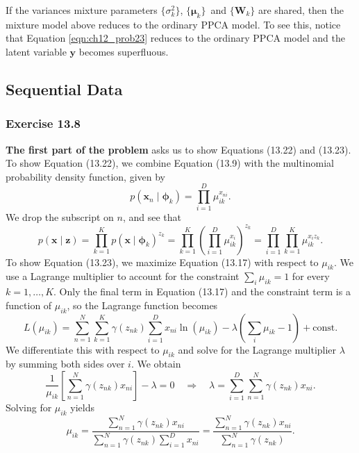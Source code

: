 \documentclass[12pt, a4paper]{article}
\newcommand{\vect}[1]{\bm{#1}}
\begin{document}
If the variances mixture parameters $\{\sigma^2_k\}$, $\{\vect{\mu}_k\}$ and $\{\vect{W}_k\}$ are shared, then the mixture model above reduces to the ordinary PPCA model.
To see this, notice that Equation \eqref{eqn:ch12_prob23} reduces to the ordinary PPCA model and the latent variable $\vect{y}$ becomes superfluous.





\subsection{Sequential Data}
\subsubsection*{Exercise 13.8}
\textbf{The first part of the problem} asks us to show Equations (13.22) and (13.23).
To show Equation (13.22), we combine Equation (13.9) with the multinomial probability density function, given by
\begin{equation*}
	p(\vect{x}_n \mid \vect{\phi}_k) = \prod_{i=1}^{D} \mu_{ik}^{x_{ni}}.
\end{equation*}
We drop the subscript on $n$, and see that
\begin{equation*}
	p(\vect{x} \mid \vect{z}) = 
	\prod_{k=1}^{K} p(\vect{x} \mid \vect{\phi}_k)^{z_{k}} 
	= \prod_{k=1}^{K} \left( \prod_{i=1}^{D} \mu_{ik}^{x_{i}} \right)^{z_{k}} 
	= \prod_{i=1}^{D} \prod_{k=1}^{K}   \mu_{ik}^{x_{i} z_{k}}.
\end{equation*}
To show Equation (13.23), we maximize Equation (13.17) with respect to $\mu_{ik}$.
We use a Lagrange multiplier to account for the constraint $\sum_i \mu_{ik} = 1$ for every $k=1,\ldots, K$.
Only the final term in Equation (13.17) and the constraint term is a function of $\mu_{ik}$, so the Lagrange function becomes
\begin{equation*}
L(\mu_{ik}) = 	\sum_{n=1}^{N} \sum_{k=1}^{K} \gamma (z_{nk})
	\sum_{i=1}^{D} x_{ni} \ln ( \mu_{ik} ) - \lambda \left( \sum_i \mu_{ik} - 1 \right) + \text{const}.
\end{equation*}
We differentiate this with respect to $\mu_{ik}$ and solve for the Lagrange multiplier $\lambda$ by summing both sides over $i$.
We obtain
\begin{equation*}
	\frac{1}{\mu_{ik}}
	\left[ \sum_{n=1}^{N} \gamma (z_{nk}) x_{ni} \right] - \lambda = 0
	\quad \Rightarrow \quad
	\lambda = \sum_{i=1}^{D} \sum_{n=1}^{N} \gamma (z_{nk}) x_{ni}.
\end{equation*}
Solving for $\mu_{ik}$ yields
\begin{equation*}
	\mu_{ik} = 
	\frac{\sum_{n=1}^{N} \gamma (z_{nk}) x_{ni}}{\sum_{n=1}^{N} \gamma (z_{nk}) \sum_{i=1}^{D} x_{ni}}
	= 
	\frac{\sum_{n=1}^{N} \gamma (z_{nk}) x_{ni}}{\sum_{n=1}^{N} \gamma (z_{nk})}.
\end{equation*}
\end{document}
